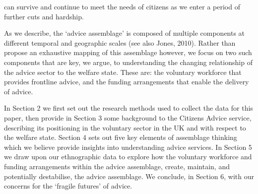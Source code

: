 can survive and continue to meet the needs of citizens as we enter a period of further cuts and hardship.
\par
As we describe, the ‘advice assemblage’ is composed of multiple components at different temporal and geographic scales (see also Jones, 2010). Rather than propose an exhaustive mapping of this assemblage however, we focus on two such components that are key, we argue, to understanding the changing relationship of the advice sector to the welfare state. These are: the voluntary workforce that provides frontline advice, and the funding arrangements that enable the delivery of advice.
\par
In Section 2 we first set out the research methods used to collect the data for this paper, then provide in Section 3 some background to the Citizens Advice service, describing its positioning in the voluntary sector in the UK and with respect to the welfare state. Section 4 sets out five key elements of assemblage thinking which we believe provide insights into understanding advice services. In Section 5 we draw upon our ethnographic data to explore how the voluntary workforce and funding arrangements within the advice assemblage, create, maintain, and potentially destabilise, the advice assemblage. We conclude, in Section 6, with our concerns for the ‘fragile futures’ of advice.

